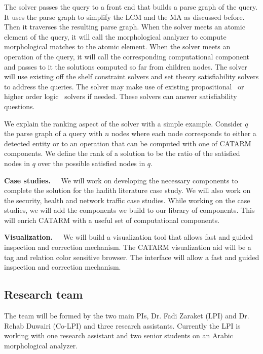 \documentclass[12pt]{article}
\begin{document}
The solver passes the query to a front end that builds
a parse graph of the query. 
It uses the parse graph to simplify the LCM and the MA
as discussed before. 
Then it traverses the resulting parse graph. 
When the solver meets an atomic element of the query, 
it will call the morphological analyzer to compute 
morphological matches to the atomic element.
When the solver meets an operation of the query, 
it will call the corresponding computational component 
and passes to it the solutions computed so far from children
nodes. 
The solver will use existing off the shelf constraint solvers 
and set theory satisfiability solvers to address the queries. 
The solver may make use of existing 
propositional~\cite{MiniSAT04} or
higher order logic~\cite{Z308} solvers if needed. 
These solvers can answer satisfiability questions.

We explain the ranking aspect of the solver with a simple
example. 
Consider $q$ the parse graph of a query with $n$ nodes where 
each node corresponds to either a detected entity or
to an operation that can be computed with one of CATARM components. 
We define the rank of a solution to be the ratio of  the 
satisfied nodes in $q$ over the possible satisfied
nodes in $q$. 


{\bf Case studies.~~}
We will work on developing the necessary components to complete 
the solution for the hadith literature  case study. 
We will also work on the security, health and network traffic case studies.
While working on the case studies, we will add the components
we build to our library of components. 
This will enrich CATARM with a useful set of computational 
components. 

{\bf Visualization.~~}
We will build a visualization tool that allows fast 
and guided inspection and correction mechanism. 
The CATARM visualization aid will be a tag and relation color
sensitive browser.
The interface will allow a fast and guided inspection and 
correction mechanism.

\subsection{Research team}

The team will be formed by the two main PIs, Dr. Fadi Zaraket (LPI)
and Dr. Rehab Duwairi (Co-LPI) and three research assistants.
Currently the LPI is working with one research assistant 
and two senior students on an Arabic morphological analyzer. 
\end{document}
